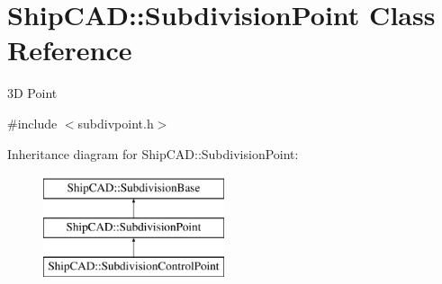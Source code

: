 \hypertarget{classShipCAD_1_1SubdivisionPoint}{\section{Ship\-C\-A\-D\-:\-:Subdivision\-Point Class Reference}
\label{classShipCAD_1_1SubdivisionPoint}
}


3\-D Point  




{\ttfamily \#include $<$subdivpoint.\-h$>$}

Inheritance diagram for Ship\-C\-A\-D\-:\-:Subdivision\-Point\-:\begin{figure}[H]
\begin{center}
\leavevmode
\includegraphics[height=3.000000cm]{classShipCAD_1_1SubdivisionPoint}
\end{center}
\end{figure}
